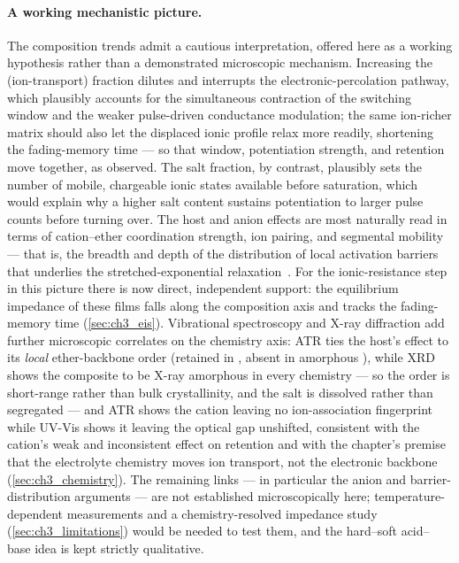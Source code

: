 \documentclass[12pt, twoside]{report}
\begin{document}
\paragraph{A working mechanistic picture.} The composition trends admit a cautious interpretation, offered here as a working hypothesis rather than a demonstrated microscopic mechanism. Increasing the \PEO{} (ion-transport) fraction dilutes and interrupts the \SY{} electronic-percolation pathway, which plausibly accounts for the simultaneous contraction of the switching window and the weaker pulse-driven conductance modulation; the same ion-richer matrix should also let the displaced ionic profile relax more readily, shortening the fading-memory time --- so that window, potentiation strength, and retention move together, as observed. The salt fraction, by contrast, plausibly sets the number of mobile, chargeable ionic states available before saturation, which would explain why a higher salt content sustains potentiation to larger pulse counts before turning over. The host and anion effects are most naturally read in terms of cation--ether coordination strength, ion pairing, and segmental mobility~\cite{RatnerShriver1988,BruceVincent1993} --- that is, the breadth and depth of the distribution of local activation barriers that underlies the stretched-exponential relaxation~\cite{Sturman2003}. For the ionic-resistance step in this picture there is now direct, independent support: the equilibrium impedance of these films falls along the composition axis and tracks the fading-memory time (\cref{sec:ch3_eis}). Vibrational spectroscopy and X-ray diffraction add further microscopic correlates on the chemistry axis: ATR ties the host's effect to its \emph{local} ether-backbone order (retained in \PEO{}, absent in amorphous \TMPE{}), while XRD shows the composite to be X-ray amorphous in every chemistry --- so the order is short-range rather than bulk crystallinity, and the salt is dissolved rather than segregated --- and ATR shows the cation leaving no ion-association fingerprint while UV-Vis shows it leaving the \SY{} optical gap unshifted, consistent with the cation's weak and inconsistent effect on retention and with the chapter's premise that the electrolyte chemistry moves ion transport, not the \SY{} electronic backbone (\cref{sec:ch3_chemistry}). The remaining links --- in particular the anion and barrier-distribution arguments --- are not established microscopically here; temperature-dependent measurements and a chemistry-resolved impedance study (\cref{sec:ch3_limitations}) would be needed to test them, and the hard--soft acid--base idea is kept strictly qualitative.
\end{document}
